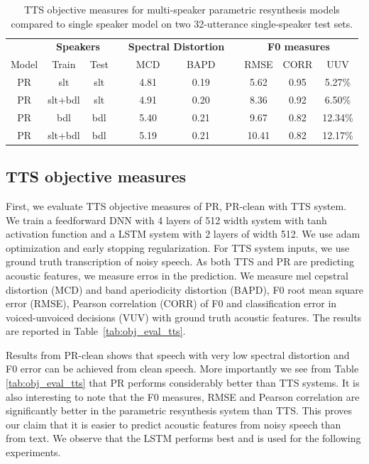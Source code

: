 \documentclass{article}
\begin{document}
\begin{table}[bt]
    \centering
    \begin{tabular}{cccccccccc} \toprule
& \multicolumn{2}{c}{\bfseries Speakers} & \phantom{a} & \multicolumn{2}{c}{\bfseries Spectral Distortion} & \phantom{a}& \multicolumn{3}{c}{\bfseries F0 measures}\\
\cmidrule{2-3}  \cmidrule{5-6}  \cmidrule{8-10}
    Model & Train & Test && MCD & BAPD && RMSE & CORR & UUV \\
     \midrule
    PR & slt      & slt    && 4.81 & 0.19 && 5.62  & 0.95 & 5.27\% \\
    PR & slt+bdl & slt    && 4.91 & 0.20 && 8.36  & 0.92 & 6.50\%\\
    PR & bdl      & bdl     && 5.40 & 0.21 && 9.67 & 0.82 & 12.34\%\\
    PR & slt+bdl & bdl    && 5.19 & 0.21 && 10.41  & 0.82 & 12.17\%\\
    \bottomrule
    \end{tabular}
    \caption{TTS objective measures for multi-speaker parametric resynthesis models compared to single speaker model on two 32-utterance single-speaker test sets. }
    \label{tab:speaker}
\end{table}


\subsection{TTS objective measures}
First, we evaluate TTS objective measures of PR, PR-clean with TTS system. We train a feedforward DNN  with 4 layers of 512 width system with tanh activation function and a LSTM  system with 2 layers of width 512. We use adam optimization and early stopping regularization. For TTS system inputs, we use ground truth transcription of noisy speech. As both TTS and PR are predicting acoustic features, we measure erros in the prediction. We measure mel cepstral distortion (MCD) and band aperiodicity distortion (BAPD), F0 root mean square error (RMSE), Pearson correlation (CORR) of F0 and classification error in voiced-unvoiced decisions (VUV) with ground truth acoustic features. The results are reported in Table~\ref{tab:obj_eval_tts}.

Results from PR-clean shows that speech with very low spectral distortion and F0 error can be achieved from clean speech. More importantly we see from Table \ref{tab:obj_eval_tts} that PR performs considerably better than TTS systems. It is also interesting to note that the F0 measures, RMSE and Pearson correlation are significantly better in the parametric resynthesis system than TTS. This proves our claim that it is easier to predict acoustic features from noisy speech than from text. We observe that the LSTM performs best and is used for the following experiments. 
\end{document}
